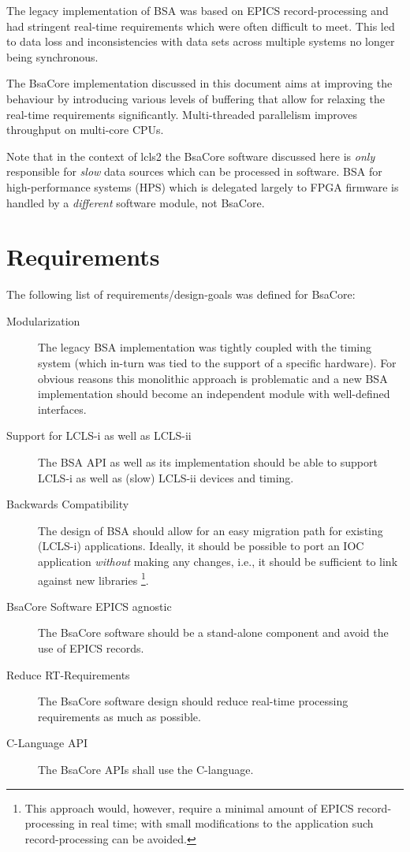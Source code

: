 \documentclass[11pt]{article}
\newcommand{\bsac}{BsaCore}
\newcommand{\bsa} {BSA}
\begin{document}
The legacy implementation of \bsa{} was based on EPICS record-processing and had stringent
real-time requirements which were often difficult to meet. This led to data loss and 
inconsistencies with data sets across multiple systems no longer being synchronous.

The \bsac{} implementation discussed in this document aims at improving the behaviour by
introducing various levels of buffering that allow for relaxing the real-time requirements
significantly. Multi-threaded parallelism improves throughput on multi-core CPUs.

Note that in the context of lcls2 the \bsac{} software discussed here is {\em only} 
responsible for {\em slow} data sources which can be processed in software. \bsa{} for
high-performance systems (HPS) which is delegated largely to FPGA firmware is handled
by a {\em different} software module, not \bsac{}.

\section{Requirements}
The following list of requirements/design-goals was defined for \bsac:
\begin{description}
\item[Modularization] The legacy \bsa{} implementation was tightly coupled with the timing
   system (which in-turn was tied to the support of a specific hardware). For obvious reasons
   this monolithic approach is problematic and a new \bsa{} implementation should become an
   independent module with well-defined interfaces.
\item[Support for LCLS-i as well as LCLS-ii] The \bsa{} API as well as its implementation should
   be able to support LCLS-i as well as (slow) LCLS-ii devices and timing.
\item[Backwards Compatibility] The design of \bsa{} should allow for an easy migration path for
   existing (LCLS-i) applications. Ideally, it should be possible to port an IOC application 
   {\em without} making any changes, i.e., it should be sufficient to link against new libraries%
\footnote{This approach would, however, require a minimal amount of EPICS record-processing in real
time; with small modifications to the application such record-processing can be avoided.}.
\item[\bsac{} Software EPICS agnostic] The \bsac{} software should be a stand-alone component and
   avoid the use of EPICS records.
\item[Reduce RT-Requirements] The \bsac{} software design should reduce real-time processing
   requirements as much as possible.
\item[C-Language API] The \bsac{} APIs shall use the C-language.
\end{description}
\end{document}
